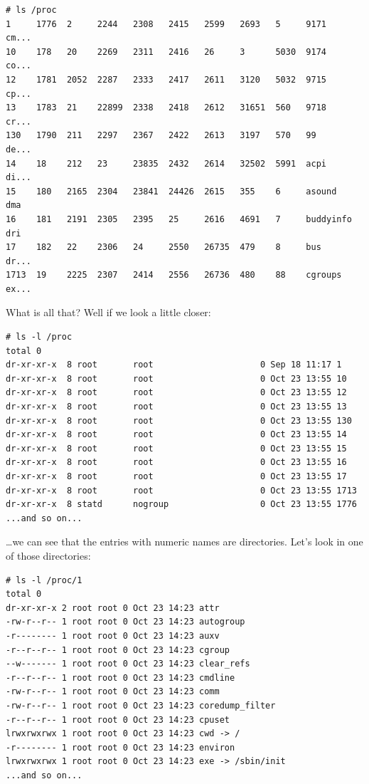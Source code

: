 \documentclass[10pt,]{book}
\numberwithin{figure}{chapter}
\begin{document}
\begin{verbatim}
# ls /proc
1     1776  2     2244   2308   2415   2599   2693   5     9171       cm...
10    178   20    2269   2311   2416   26     3      5030  9174       co...
12    1781  2052  2287   2333   2417   2611   3120   5032  9715       cp...
13    1783  21    22899  2338   2418   2612   31651  560   9718       cr...
130   1790  211   2297   2367   2422   2613   3197   570   99         de...
14    18    212   23     23835  2432   2614   32502  5991  acpi       di...
15    180   2165  2304   23841  24426  2615   355    6     asound     dma
16    181   2191  2305   2395   25     2616   4691   7     buddyinfo  dri
17    182   22    2306   24     2550   26735  479    8     bus        dr...
1713  19    2225  2307   2414   2556   26736  480    88    cgroups    ex...
\end{verbatim}

What is all that? Well if we look a little closer:

\begin{verbatim}
# ls -l /proc
total 0
dr-xr-xr-x  8 root       root                     0 Sep 18 11:17 1
dr-xr-xr-x  8 root       root                     0 Oct 23 13:55 10
dr-xr-xr-x  8 root       root                     0 Oct 23 13:55 12
dr-xr-xr-x  8 root       root                     0 Oct 23 13:55 13
dr-xr-xr-x  8 root       root                     0 Oct 23 13:55 130
dr-xr-xr-x  8 root       root                     0 Oct 23 13:55 14
dr-xr-xr-x  8 root       root                     0 Oct 23 13:55 15
dr-xr-xr-x  8 root       root                     0 Oct 23 13:55 16
dr-xr-xr-x  8 root       root                     0 Oct 23 13:55 17
dr-xr-xr-x  8 root       root                     0 Oct 23 13:55 1713
dr-xr-xr-x  8 statd      nogroup                  0 Oct 23 13:55 1776
...and so on...
\end{verbatim}

\ldots{}we can see that the entries with numeric names are directories.
Let's look in one of those directories:

\begin{verbatim}
# ls -l /proc/1
total 0
dr-xr-xr-x 2 root root 0 Oct 23 14:23 attr
-rw-r--r-- 1 root root 0 Oct 23 14:23 autogroup
-r-------- 1 root root 0 Oct 23 14:23 auxv
-r--r--r-- 1 root root 0 Oct 23 14:23 cgroup
--w------- 1 root root 0 Oct 23 14:23 clear_refs
-r--r--r-- 1 root root 0 Oct 23 14:23 cmdline
-rw-r--r-- 1 root root 0 Oct 23 14:23 comm
-rw-r--r-- 1 root root 0 Oct 23 14:23 coredump_filter
-r--r--r-- 1 root root 0 Oct 23 14:23 cpuset
lrwxrwxrwx 1 root root 0 Oct 23 14:23 cwd -> /
-r-------- 1 root root 0 Oct 23 14:23 environ
lrwxrwxrwx 1 root root 0 Oct 23 14:23 exe -> /sbin/init
...and so on...
\end{verbatim}
\end{document}
